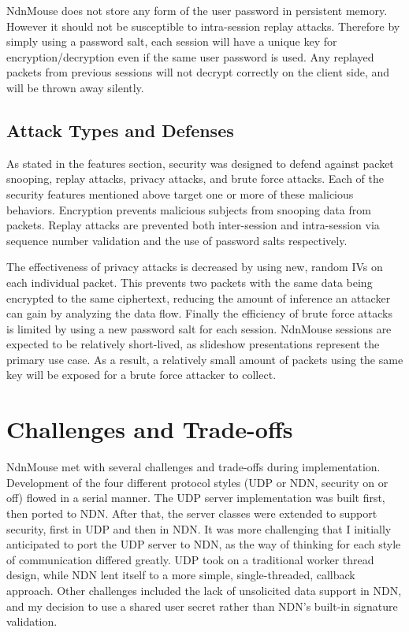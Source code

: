 \documentclass{sig-alternate}
\renewcommand\_{\textunderscore\allowbreak}  %
\begin{document}
NdnMouse does not store any form of the user password in persistent memory. However it should not be susceptible to intra-session replay attacks. Therefore by simply using a password salt, each session will have a unique key for encryption/decryption even if the same user password is used. Any replayed packets from previous sessions will not decrypt correctly on the client side, and will be thrown away silently.

\subsection{Attack Types and Defenses}
As stated in the features section, security was designed to defend against packet snooping, replay attacks, privacy attacks, and brute force attacks. Each of the security features mentioned above target one or more of these malicious behaviors. Encryption prevents malicious subjects from snooping data from packets. Replay attacks are prevented both inter-session and intra-session via sequence number validation and the use of password salts respectively. 

The effectiveness of privacy attacks is decreased by using new, random IVs on each individual packet. This prevents two packets with the same data being encrypted to the same ciphertext, reducing the amount of inference an attacker can gain by analyzing the data flow. Finally the efficiency of brute force attacks is limited by using a new password salt for each session. NdnMouse sessions are expected to be relatively short-lived, as slideshow presentations represent the primary use case. As a result, a relatively small amount of packets using the same key will be exposed for a brute force attacker to collect.
	
\section{Challenges and Trade-offs}
NdnMouse met with several challenges and trade-offs during implementation. Development of the four different protocol styles (UDP or NDN, security on or off) flowed in a serial manner. The UDP server implementation was built first, then ported to NDN. After that, the server classes were extended to support security, first in UDP and then in NDN. It was more challenging that I initially anticipated to port the UDP server to NDN, as the way of thinking for each style of communication differed greatly. UDP took on a traditional worker thread design, while NDN lent itself to a more simple, single-threaded, callback approach. Other challenges included the lack of unsolicited data support in NDN, and my decision to use a shared user secret rather than NDN's built-in signature validation.
\end{document}
